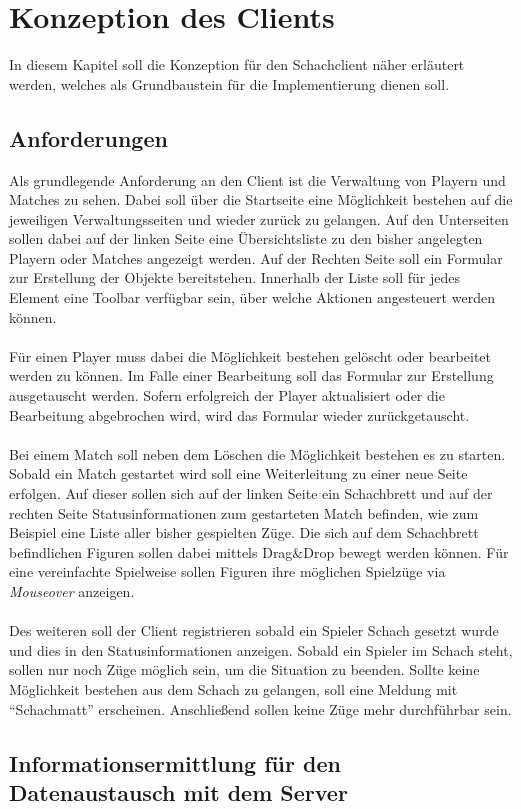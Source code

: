 
\chapter{Konzeption des Clients}
In diesem Kapitel soll die Konzeption für den Schachclient näher erläutert werden, welches als Grundbaustein für die Implementierung dienen soll. 

\section{Anforderungen}
Als grundlegende Anforderung an den Client ist die Verwaltung von Playern und Matches zu sehen. Dabei soll über die Startseite eine Möglichkeit bestehen auf die jeweiligen Verwaltungsseiten und wieder zurück zu gelangen. Auf den Unterseiten sollen dabei auf der linken Seite eine Übersichtsliste zu den bisher angelegten Playern oder Matches angezeigt werden. Auf der Rechten Seite soll ein Formular zur Erstellung der Objekte bereitstehen. Innerhalb der Liste soll für jedes Element eine Toolbar verfügbar sein, über welche Aktionen angesteuert werden können. \\
\\
Für einen Player muss dabei die Möglichkeit bestehen gelöscht oder bearbeitet werden zu können. Im Falle einer Bearbeitung soll das Formular zur Erstellung ausgetauscht werden. Sofern erfolgreich der Player aktualisiert oder die Bearbeitung abgebrochen wird, wird das Formular wieder zurückgetauscht.\\
\\
Bei einem Match soll neben dem Löschen die Möglichkeit bestehen es zu starten. Sobald ein Match gestartet wird soll eine Weiterleitung zu einer neue Seite erfolgen. Auf dieser sollen sich auf der linken Seite ein Schachbrett und auf der rechten Seite Statusinformationen zum gestarteten Match befinden, wie zum Beispiel eine Liste aller bisher gespielten Züge. Die sich auf dem Schachbrett befindlichen Figuren sollen dabei mittels Drag\&Drop bewegt werden können. Für eine vereinfachte Spielweise sollen Figuren ihre möglichen Spielzüge via \textit{Mouseover} anzeigen.\\
\\
Des weiteren soll der Client registrieren sobald ein Spieler Schach gesetzt wurde und dies in den Statusinformationen anzeigen. Sobald ein Spieler im Schach steht, sollen nur noch Züge möglich sein, um die Situation zu beenden. Sollte keine Möglichkeit bestehen aus dem Schach zu gelangen, soll eine Meldung mit \enquote{Schachmatt} erscheinen. Anschließend sollen keine Züge mehr durchführbar sein.

\section{Informationsermittlung für den Datenaustausch mit dem Server}